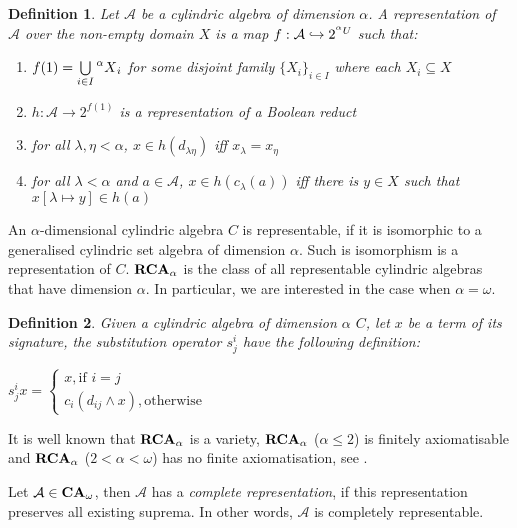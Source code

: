 \documentclass[a4paper]{article}
\theoremstyle{defin}
\newtheorem{defin}{Definition}
\theoremstyle{theorem}
\theoremstyle{prop}
\theoremstyle{lemma}
\theoremstyle{fact}
\theoremstyle{ex}
\theoremstyle{col}
\begin{document}
\begin{defin}
  Let $\mathcal{A}$ be a cylindric algebra of dimension $\alpha$. A representation of $\mathcal{A}$ over the non-empty domain $X$ is a map $f : \mathcal{A} \hookrightarrow 2^{\prescript{\alpha}{}U}$ such that:
  \begin{enumerate}
    \item $f(1) = \bigcup \limits_{i \in I} \prescript{\alpha}{}X_i$ for some disjoint family $\{X_i\}_{i \in I}$ where each $X_i \subseteq X$
    \item $h : \mathcal{A} \to 2^{f(1)}$ is a representation of a Boolean reduct
    \item for all $\lambda, \eta < \alpha$, $x \in h(d_{\lambda \eta})$ iff $x_{\lambda} = x_{\eta}$
    \item for all $\lambda < \alpha$ and $a \in \mathcal{A}$, $x \in h(c_{\lambda}(a))$ iff there is $y \in X$ such that $x[\lambda \mapsto y] \in h(a)$
  \end{enumerate}
\end{defin}

An $\alpha$-dimensional cylindric algebra $C$ is representable, if it is isomorphic to a generalised cylindric set algebra
of dimension $\alpha$. Such is isomorphism is a representation of $C$. ${\bf RCA}_{\alpha}$ is the class of all representable cylindric algebras that have dimension $\alpha$. In particular, we are interested in the case when $\alpha = \omega$.

\begin{defin}
  Given a cylindric algebra of dimension $\alpha$ $C$, let $x$ be a term of its signature, the substitution operator $s^{i}_{j}$ have the following definition:
  \begin{center}
  $s^{i}_{j} x = \begin{cases} x, \text{if } i = j \\ c_i (d_{ij} \land x), \text{otherwise} \end{cases}$
  \end{center}
\end{defin}

It is well known that ${\bf RCA}_{\alpha}$ is a variety, ${\bf RCA}_{\alpha}$ ($\alpha \leq 2$) is finitely axiomatisable and ${\bf RCA}_{\alpha}$ ($2 < \alpha < \omega$) has no finite axiomatisation, see \cite{Henkin1988-HENCAP-4}.

Let $\mathcal{A} \in {\bf CA}_{\omega}$, then $\mathcal{A}$ has a \emph{complete representation}, if this representation preserves all existing suprema. In other words, $\mathcal{A}$ is completely representable.
\end{document}
